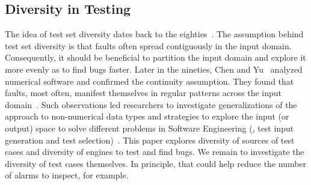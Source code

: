 \documentclass[sigconf,review, anonymous]{acmart}
\begin{document}
\subsection{Diversity in Testing}
The idea of test set diversity dates back to the
eighties~\cite{white-cohen-tse1980, ostrand-balcer-1988}. The
assumption behind test set diversity is that faults often spread
contiguously in the input domain. Consequently, it should be
beneficial to partition the input domain and explore it more evenly as
to find bugs faster. Later in the nineties, Chen and
Yu~\cite{chen-yu-tse1996} analyzed numerical software and confirmed
the continuity assumption. They found that faults, most often, manifest
themselves in regular patterns across the input
domain~\cite{Chen:2010:ART:1663656.1663914,7515474}.  Such
observations led researchers to investigate generalizations of the
approach to non-numerical data types and strategies to explore the
input (or output) space to solve different problems in Software
Engineering (\eg{}, test input generation and test
selection)~\cite{mayer-ase2005,bueno-etal-ase2007,ciupa-etal-icse08,alshahwan-harman-icse2012,alshahwan-harman-issta2014,7515474}. This
paper explores diversity of sources of test cases and diversity of
engines to test and find bugs. We remain to investigate the diversity
of test cases themselves. In principle, that could help reduce the
number of alarms to inspect, for example.
\end{document}
